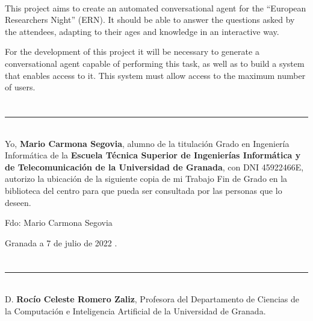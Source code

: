 \vspace{0.7cm}
\\

This project aims to create an automated conversational agent for the ``European Researchers Night'' (ERN). It should be able to answer the questions asked by the attendees, adapting to their ages and knowledge in an interactive way.

For the development of this project it will be necessary to generate a conversational agent capable of performing this task, as well as to build a system that enables access to it. This system must allow access to the maximum number of users.

\chapter*{}
\thispagestyle{empty}

\noindent\rule[-1ex]{\textwidth}{2pt}\\[4.5ex]

Yo, \textbf{Mario Carmona Segovia}, alumno de la titulación Grado en Ingeniería Informática de la \textbf{Escuela Técnica Superior
de Ingenierías Informática y de Telecomunicación de la Universidad de Granada}, con DNI 45922466E, autorizo la
ubicación de la siguiente copia de mi Trabajo Fin de Grado en la biblioteca del centro para que pueda ser
consultada por las personas que lo deseen.

\vspace{6cm}

\noindent Fdo: Mario Carmona Segovia

\vspace{2cm}

\begin{flushright}
Granada a 7 de julio de 2022 .
\end{flushright}


\chapter*{}
\thispagestyle{empty}

\noindent\rule[-1ex]{\textwidth}{2pt}\\[4.5ex]

D. \textbf{Rocío Celeste Romero Zaliz}, Profesora del Departamento de Ciencias de la Computación e Inteligencia Artificial de la Universidad de Granada.

\vspace{0.5cm}

